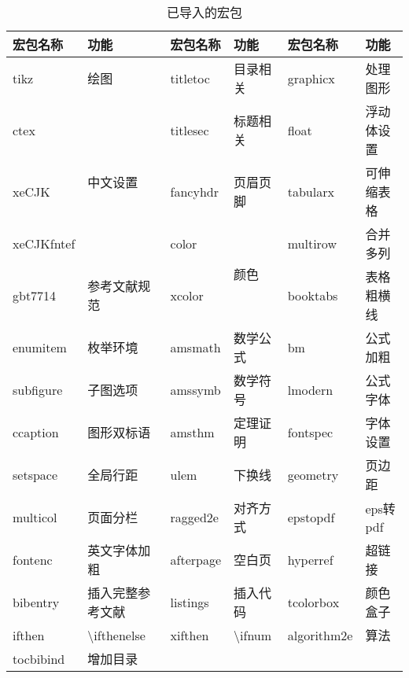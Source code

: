 \begin{table}[H]
    \centering
    \caption{已导入的宏包}
    \label{tab:pkgs}
    \begin{tabular}{llllll}
    \toprule
    宏包名称       & 功能                    & 宏包名称      & 功能                  & 宏包名称      & 功能      \\ 
    \midrule
    tikz       & 绘图                    & titletoc  & 目录相关                & graphicx  & 处理图形    \\
    ctex       & \multirow{3}{*}{中文设置} & titlesec  & 标题相关                & float     & 浮动体设置   \\
    xeCJK      &                       & fancyhdr  & 页眉页脚                & tabularx  & 可伸缩表格   \\
    xeCJKfntef &                       & color     & \multirow{2}{*}{颜色} & multirow  & 合并多列    \\
    gbt7714    & 参考文献规范                & xcolor    &                     & booktabs  & 表格粗横线   \\
    enumitem   & 枚举环境                  & amsmath   & 数学公式                & bm        & 公式加粗    \\
    subfigure  & 子图选项                  & amssymb   & 数学符号                & lmodern   & 公式字体    \\
    ccaption   & 图形双标语                 & amsthm    & 定理证明                & fontspec  & 字体设置    \\
    setspace   & 全局行距                  & ulem      & 下换线                 & geometry  & 页边距     \\
    multicol   & 页面分栏                  & ragged2e  & 对齐方式                & epstopdf  & eps转pdf \\
    fontenc    & 英文字体加粗                & afterpage & 空白页                 & hyperref  & 超链接     \\
    bibentry   & 插入完整参考文献              & listings  & 插入代码                & tcolorbox & 颜色盒子    \\
    ifthen & \textbackslash{}ifthenelse & xifthen & {}\textbackslash{}ifnum & algorithm2e & 算法 \\ 
    tocbibind & 增加目录 &  & &  &  \\ 
    \bottomrule
    \end{tabular}%
\end{table}

